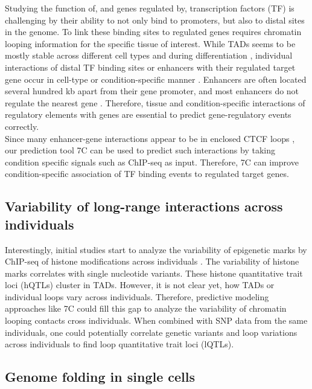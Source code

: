 \documentclass[a4paper,twoside=true,openright,parskip=full,chapterprefix=true,11pt,headings=normal,bibliography=totoc,listof=totoc,titlepage=on,captions=tableabove,draft=false]{scrreprt}
\theoremstyle{definition}
\theoremstyle{definition}
\theoremstyle{definition}
\theoremstyle{remark}
\begin{document}
Studying the function of, and genes regulated by, transcription factors
(TF) is challenging by their ability to not only bind to promoters, but
also to distal sites in the genome. To link these binding sites to
regulated genes requires chromatin looping information for the specific
tissue of interest. While TADs seems to be mostly stable across
different cell types \citep{Dixon2012} and during differentiation
\citep{Dixon2015}, individual interactions of distal TF binding sites or
enhancers with their regulated target gene occur in cell-type or
condition-specific manner \citep{Bonev2016, Andrey2017}. Enhancers are
often located several hundred kb apart from their gene promoter, and
most enhancers do not regulate the nearest gene \citep{Sanyal2012}.
Therefore, tissue and condition-specific interactions of regulatory
elements with genes are essential to predict gene-regulatory events
correctly.\\
Since many enhancer-gene interactions appear to be in enclosed CTCF
loops \citep{Hnisz2016a}, our prediction tool 7C can be used to predict
such interactions by taking condition specific signals such as ChIP-seq
as input. Therefore, 7C can improve condition-specific association of TF
binding events to regulated target genes.

\hypertarget{variability-of-long-range-interactions-across-individuals}{%
\subsection{Variability of long-range interactions across
individuals}\label{variability-of-long-range-interactions-across-individuals}}

Interestingly, initial studies start to analyze the variability of
epigenetic marks by ChIP-seq of histone modifications across individuals
\citep{Grubert2015, Waszak2015}. The variability of histone marks
correlates with single nucleotide variants. These histone quantitative
trait loci (hQTLs) cluster in TADs. However, it is not clear yet, how
TADs or individual loops vary across individuals. Therefore, predictive
modeling approaches like 7C could fill this gap to analyze the
variability of chromatin looping contacts cross individuals. When
combined with SNP data from the same individuals, one could potentially
correlate genetic variants and loop variations across individuals to
find loop quantitative trait loci (lQTLs).

\hypertarget{genome-folding-in-single-cells}{%
\subsection{Genome folding in single
cells}\label{genome-folding-in-single-cells}}
\end{document}
